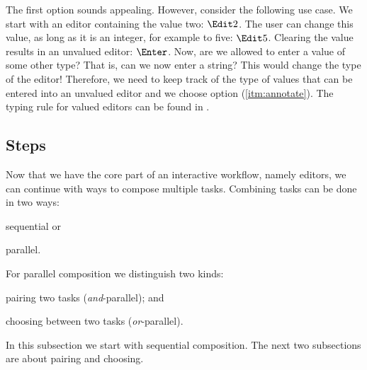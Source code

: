The first option sounds appealing.
However, consider the following use case.
We start with an editor containing the value two: $\Edit 2$.
The user can change this value, as long as it is an integer,
for example to five: $\Edit 5$.
Clearing the value results in an unvalued editor: $\Enter$.
Now, are we allowed to enter a value of some other type?
That is, can we now enter a string?
This would change the type of the editor!
Therefore,
we need to keep track of the type of values that can be entered into an unvalued editor
and we choose option (\ref{itm:annotate}).
The typing rule for valued editors can be found in .




\subsection{Steps}

Now that we have the core part of an interactive workflow,
namely editors,
we can continue with ways to compose multiple tasks.
Combining tasks can be done in two ways:
\begin{enumerate*}
  \item sequential or
  \item parallel.
\end{enumerate*}
For parallel composition we distinguish two kinds:
\begin{enumerate*}[(a)]
  \item pairing two tasks (\emph{and}-parallel); and
  \item choosing between two tasks (\emph{or}-parallel).
\end{enumerate*}
In this subsection we start with sequential composition.
The next two subsections are about pairing and choosing.

